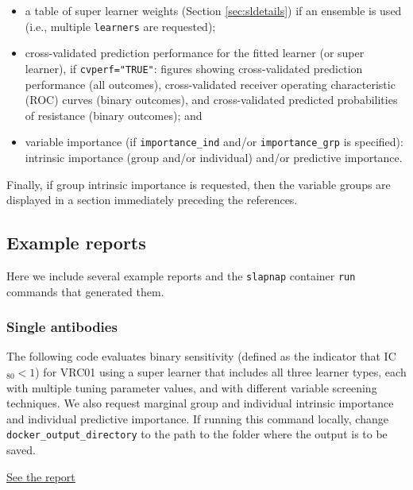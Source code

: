 \documentclass[
]{article}
\providecommand{\tightlist}{%
  \setlength{\itemsep}{0pt}\setlength{\parskip}{0pt}}
\begin{document}
\begin{itemize}
\tightlist
\item
  a table of super learner weights (Section \ref{sec:sldetails}) if an ensemble is used (i.e., multiple \texttt{learners} are requested);
\item
  cross-validated prediction performance for the fitted learner (or super learner), if \texttt{cvperf="TRUE"}: figures showing cross-validated prediction performance (all outcomes), cross-validated receiver operating characteristic (ROC) curves (binary outcomes), and cross-validated predicted probabilities of resistance (binary outcomes); and
\item
  variable importance (if \texttt{importance\_ind} and/or \texttt{importance\_grp} is specified): intrinsic importance (group and/or individual) and/or predictive importance.
\end{itemize}

Finally, if group intrinsic importance is requested, then the variable groups are displayed in a section immediately preceding the references.

\hypertarget{example-reports}{%
\subsection{Example reports}\label{example-reports}}

Here we include several example reports and the \texttt{slapnap} container \texttt{run} commands that generated them.

\hypertarget{single-antibodies}{%
\subsubsection{Single antibodies}\label{single-antibodies}}

The following code evaluates binary sensitivity (defined as the indicator that IC\(_{80} < 1\)) for VRC01 using a super learner that includes all three learner types, each with multiple tuning parameter values, and with different variable screening techniques. We also request marginal group and individual intrinsic importance and individual predictive importance. If running this command locally, change \texttt{docker\_output\_directory} to the path to the folder where the output is to be saved.

\href{reports/report_VRC01.html}{See the report}
\end{document}
